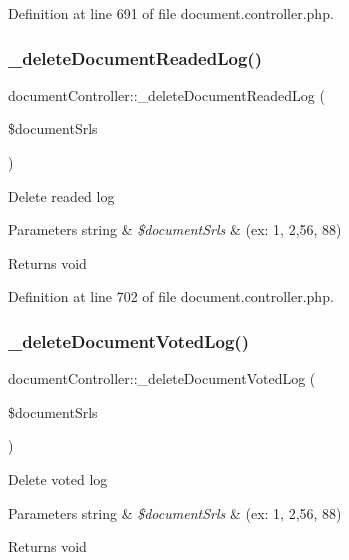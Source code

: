 Definition at line 691 of file document.\+controller.\+php.

\hypertarget{classdocumentController_ac055fa2cc48de200d0b319eddd7a13da}{}\label{classdocumentController_ac055fa2cc48de200d0b319eddd7a13da} 
\subsubsection{\texorpdfstring{\+\_\+delete\+Document\+Readed\+Log()}{\_deleteDocumentReadedLog()}}
{\footnotesize\ttfamily document\+Controller\+::\+\_\+delete\+Document\+Readed\+Log (\begin{DoxyParamCaption}\item[{}]{\$document\+Srls }\end{DoxyParamCaption})}

Delete readed log 
\begin{DoxyParams}[1]{Parameters}
string & {\em \$document\+Srls} & (ex\+: 1, 2,56, 88) \\
\hline
\end{DoxyParams}
\begin{DoxyReturn}{Returns}
void 
\end{DoxyReturn}


Definition at line 702 of file document.\+controller.\+php.

\hypertarget{classdocumentController_a9fe391d1b1ece3b7b16d15976c1622d0}{}\label{classdocumentController_a9fe391d1b1ece3b7b16d15976c1622d0} 
\subsubsection{\texorpdfstring{\+\_\+delete\+Document\+Voted\+Log()}{\_deleteDocumentVotedLog()}}
{\footnotesize\ttfamily document\+Controller\+::\+\_\+delete\+Document\+Voted\+Log (\begin{DoxyParamCaption}\item[{}]{\$document\+Srls }\end{DoxyParamCaption})}

Delete voted log 
\begin{DoxyParams}[1]{Parameters}
string & {\em \$document\+Srls} & (ex\+: 1, 2,56, 88) \\
\hline
\end{DoxyParams}
\begin{DoxyReturn}{Returns}
void 
\end{DoxyReturn}


